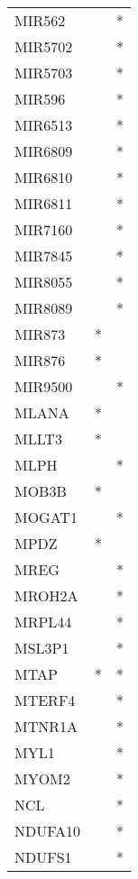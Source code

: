 \begin{longtable}{lcc}
MIR562         &           &       * \\
MIR5702        &           &       * \\
MIR5703        &           &       * \\
MIR596         &           &       * \\
MIR6513        &           &       * \\
MIR6809        &           &       * \\
MIR6810        &           &       * \\
MIR6811        &           &       * \\
MIR7160        &           &       * \\
MIR7845        &           &       * \\
MIR8055        &           &       * \\
MIR8089        &           &       * \\
MIR873         &         * &         \\
MIR876         &         * &         \\
MIR9500        &           &       * \\
MLANA          &         * &         \\
MLLT3          &         * &         \\
MLPH           &           &       * \\
MOB3B          &         * &         \\
MOGAT1         &           &       * \\
MPDZ           &         * &         \\
MREG           &           &       * \\
MROH2A         &           &       * \\
MRPL44         &           &       * \\
MSL3P1         &           &       * \\
MTAP           &         * &       * \\
MTERF4         &           &       * \\
MTNR1A         &           &       * \\
MYL1           &           &       * \\
MYOM2          &           &       * \\
NCL            &           &       * \\
NDUFA10        &           &       * \\
NDUFS1         &           &       * \\

\end{longtable}
